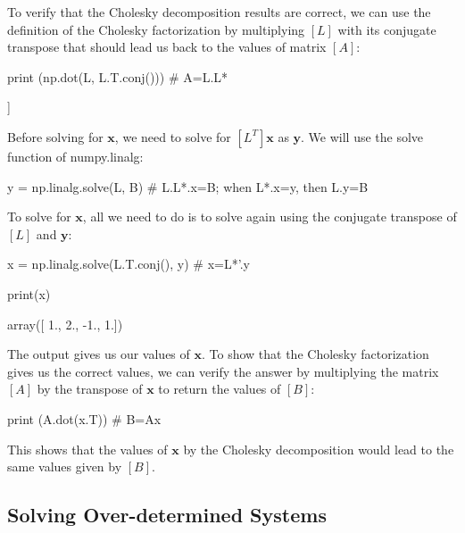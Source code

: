 To verify that the Cholesky decomposition results are correct, we can use the definition of the Cholesky factorization by multiplying $[L]$ with its conjugate transpose that should lead us back to the values of matrix $[A]$:

\begin{ipython}
print (np.dot(L, L.T.conj())) # A=L.L* 
\end{ipython}
\begin{ioutput}
[[ 10. -1.  2   0.]
 [ -1. 11. -1.  3.] 
 [  2. -1. 10. -1.] 
 [  0.  3. -1.  8.]]
\end{ioutput}

Before solving for $\boldsymbol{x}$, we need to solve for $[L^T]\boldsymbol{x}$ as $\boldsymbol{y}$. We will use the solve function of numpy.linalg:

\begin{ipython}
y = np.linalg.solve(L, B) # L.L*.x=B; when L*.x=y, then L.y=B
\end{ipython}

To solve for $\boldsymbol{x}$, all we need to do is to solve again using the conjugate transpose of $[L]$ and $\boldsymbol{y}$:

\begin{ipython}
x = np.linalg.solve(L.T.conj(), y) # x=L*'.y

print(x)
\end{ipython}
\begin{ioutput}
array([ 1.,  2., -1.,  1.])
\end{ioutput}
The output gives us our values of $\boldsymbol{x}$. To show that the Cholesky factorization gives us the correct values, we can verify the answer by multiplying the matrix $[A]$ by the transpose of $\boldsymbol{x}$ to return the values of $[B]$:
\begin{ipython}
print (A.dot(x.T)) # B=Ax 
\end{ipython}
\begin{ioutput}
[  6.  25. -11.  15.]
\end{ioutput}

This shows that the values of $\boldsymbol{x}$ by the Cholesky decomposition would lead to the same values given by $[B]$.

\subsection{Solving Over-determined Systems}
\label{using-the-pseudoinverse-to-solve-a-overdetermined-system-of-linear-equations}

